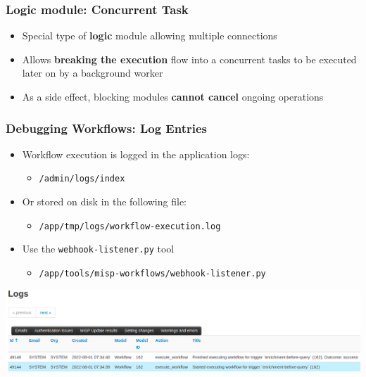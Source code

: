 \begin{frame}
    \frametitle{Logic module: Concurrent Task}
    \begin{itemize}
        \item Special type of \textbf{logic} module allowing multiple connections
        \item Allows \textbf{breaking the execution} flow into a concurrent tasks to be executed later on by a background worker
        \item As a side effect, blocking modules \textbf{cannot cancel} ongoing operations
    \end{itemize}
    \begin{center}
    \end{center}
\end{frame}

\begin{frame}
    \frametitle{Debugging Workflows: Log Entries}
    \begin{itemize}
        \item Workflow execution is logged in the application logs:
        \begin{itemize}
            \item \texttt{/admin/logs/index}
        \end{itemize}
        \item Or stored on disk in the following file:
        \begin{itemize}
            \item \texttt{/app/tmp/logs/workflow-execution.log}
        \end{itemize}
        \item Use the \texttt{webhook-listener.py} tool
        \begin{itemize}
            \item \texttt{/app/tools/misp-workflows/webhook-listener.py}
        \end{itemize}
    \end{itemize}
    \begin{center}
        \includegraphics[width=1.0\linewidth]{pictures/workflow-debug.png}
    \end{center}
\end{frame}

